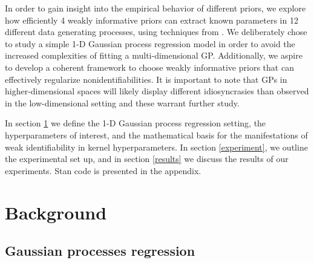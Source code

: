 \documentclass{article}
\begin{document}
In order to gain insight into the empirical behavior of different priors, we
explore how efficiently 4 weakly informative priors can extract known
parameters in 12 different data generating processes, using techniques from
\citet{cook2012validation}. We deliberately chose to study a simple 1-D
Gaussian process regression model in order to avoid the increased complexities
of fitting a multi-dimensional GP.  Additionally, we aspire to develop a
coherent framework to choose weakly informative priors that can effectively
regularize nonidentifiabilities.  It is important to note that GPs in
higher-dimensional spaces will likely display different idiosyncrasies than
observed in the low-dimensional setting and these warrant further study.

In section \ref{background} we define the 1-D Gaussian process regression setting,
the hyperparameters of interest, and the mathematical basis for the manifestations
of weak identifiability in kernel hyperparameters. In section \ref{experiment}, we 
outline the experimental set up, and in section \ref{results} we discuss the results 
of our experiments. Stan code is presented in the appendix.


\section{Background} \label{background}

\subsection{Gaussian processes regression}

\end{document}

